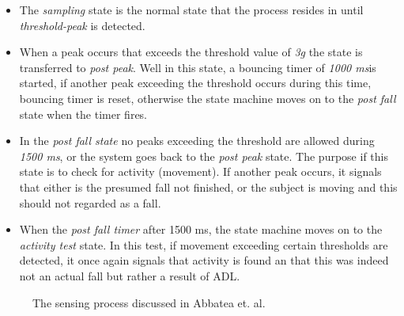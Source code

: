 \documentclass[12pt, a4paper, onecolumn]{article}
\begin{document}
		\begin{itemize}
			\item The \textit{sampling} state is the normal state that the process resides in until \textit{threshold-peak} is detected.
			
			\item When a peak occurs that exceeds the threshold value of \textit{3g} the state is transferred to \textit{post peak}. Well in this state, a bouncing timer of \textit{1000 ms}is started, if another peak exceeding the threshold occurs during this time, bouncing timer is reset, otherwise the state machine moves on to the \textit{post fall} state when the timer fires.

			\item In the \textit{post fall state} no peaks exceeding the threshold are allowed during \textit{1500 ms}, or the system goes back to the \textit{post peak} state. The purpose if this state is to check for activity (movement). If another peak occurs, it signals that either is the presumed fall not finished, or the subject is moving and this should not regarded as a fall. 
			
			\item When the \textit{post fall timer} after 1500 ms, the state machine moves on to the \textit{activity test} state. In this test, if movement exceeding certain thresholds are detected, it once again signals that activity is found an that this was indeed not an actual fall but rather a result of ADL. 

		\end{itemize}  

			\begin{figure}[h]
			\centering
			\caption{The sensing process discussed in Abbatea et. al.}%
			\label{fig:example}%
		\end{figure}
		
\end{document}
